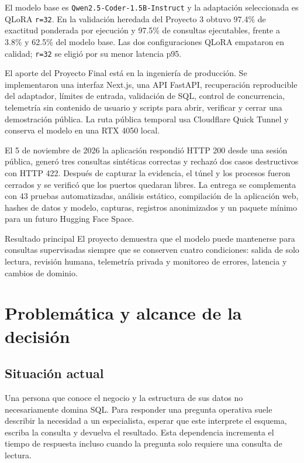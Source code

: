 \documentclass[11pt,letterpaper]{article}
\newcommand{\code}[1]{\texttt{#1}}
\begin{document}
El modelo base es \code{Qwen2.5-Coder-1.5B-Instruct} y la adaptación seleccionada es QLoRA
\code{r=32}. En la validación heredada del Proyecto 3 obtuvo 97.4\% de exactitud ponderada por
ejecución y 97.5\% de consultas ejecutables, frente a 3.8\% y 62.5\% del modelo base. Las dos
configuraciones QLoRA empataron en calidad; \code{r=32} se eligió por su menor latencia p95.

El aporte del Proyecto Final está en la ingeniería de producción. Se implementaron una interfaz
Next.js, una API FastAPI, recuperación reproducible del adaptador, límites de entrada, validación de
SQL, control de concurrencia, telemetría sin contenido de usuario y scripts para abrir, verificar y
cerrar una demostración pública. La ruta pública temporal usa Cloudflare Quick Tunnel y conserva el
modelo en una RTX 4050 local.

El 5 de noviembre de 2026 la aplicación respondió HTTP 200 desde una sesión pública, generó tres
consultas sintéticas correctas y rechazó dos casos destructivos con HTTP 422. Después de capturar la
evidencia, el túnel y los procesos fueron cerrados y se verificó que los puertos quedaran libres. La
entrega se complementa con 43 pruebas automatizadas, análisis estático, compilación de la aplicación
web, hashes de datos y modelo, capturas, registros anonimizados y un paquete mínimo para un futuro
Hugging Face Space.

\begin{resultado}{Resultado principal}
El proyecto demuestra que el modelo puede mantenerse para consultas supervisadas siempre que se
conserven cuatro condiciones: salida de solo lectura, revisión humana, telemetría privada y monitoreo
de errores, latencia y cambios de dominio.
\end{resultado}

\section{Problemática y alcance de la decisión}

\subsection{Situación actual}

Una persona que conoce el negocio y la estructura de sus datos no necesariamente domina SQL. Para
responder una pregunta operativa suele describir la necesidad a un especialista, esperar que este
interprete el esquema, escriba la consulta y devuelva el resultado. Esta dependencia incrementa el
tiempo de respuesta incluso cuando la pregunta solo requiere una consulta de lectura.
\end{document}
